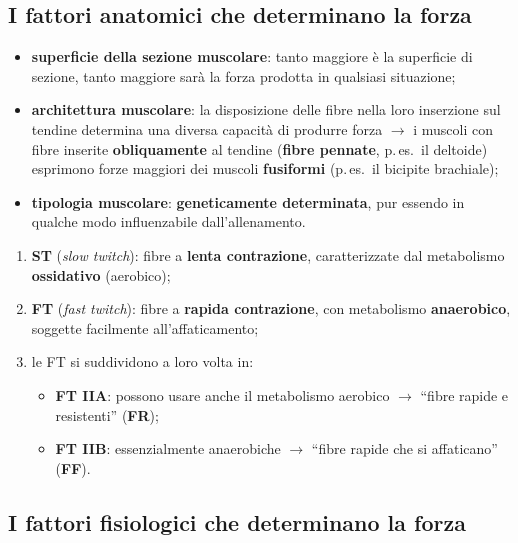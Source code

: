 \subsection{I fattori anatomici che determinano la forza}

\begin{itemize}
  \item \textbf{superficie della sezione muscolare}: tanto maggiore è la superficie di sezione,
    tanto maggiore sarà la forza prodotta in qualsiasi situazione;
  \item \textbf{architettura muscolare}: la disposizione delle fibre nella loro inserzione sul
    tendine determina una diversa capacità di produrre forza $\rightarrow$ i muscoli con fibre
    inserite \textbf{obliquamente} al tendine (\textbf{fibre pennate}, p.\,es.\ il deltoide)
    esprimono forze maggiori dei muscoli \textbf{fusiformi} (p.\,es.\ il bicipite brachiale);
  \item \textbf{tipologia muscolare}: \textbf{geneticamente determinata}, pur essendo in qualche
    modo influenzabile dall'allenamento.
\end{itemize}

\begin{enumerate}
  \item \textbf{ST} (\textit{slow twitch}): fibre a \textbf{lenta contrazione}, caratterizzate dal
    metabolismo \textbf{ossidativo} (aerobico);
  \item \textbf{FT} (\textit{fast twitch}): fibre a \textbf{rapida contrazione}, con metabolismo
    \textbf{anaerobico}, soggette facilmente all'affaticamento;
  \item le FT si suddividono a loro volta in:
    \begin{itemize}
      \item \textbf{FT IIA}: possono usare anche il metabolismo aerobico $\rightarrow$ ``fibre
        rapide e resistenti'' (\textbf{FR});
      \item \textbf{FT IIB}: essenzialmente anaerobiche $\rightarrow$ ``fibre rapide che si
        affaticano'' (\textbf{FF}).
    \end{itemize}
\end{enumerate}

\subsection{I fattori fisiologici che determinano la forza}

